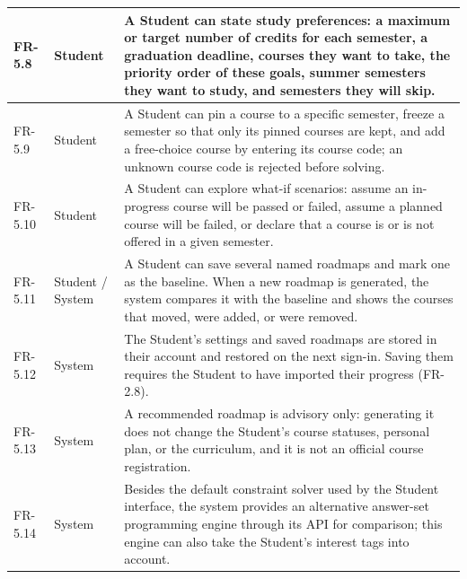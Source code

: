 \begin{longtable}{|p{}|p{}|p{}|}
\hline
FR-5.8 & Student & A Student can state study preferences: a maximum or target number of credits for each semester, a graduation deadline, courses they want to take, the priority order of these goals, summer semesters they want to study, and semesters they will skip. \\
\hline
FR-5.9 & Student & A Student can pin a course to a specific semester, freeze a semester so that only its pinned courses are kept, and add a free-choice course by entering its course code; an unknown course code is rejected before solving. \\
\hline
FR-5.10 & Student & A Student can explore what-if scenarios: assume an in-progress course will be passed or failed, assume a planned course will be failed, or declare that a course is or is not offered in a given semester. \\
\hline
FR-5.11 & Student / System & A Student can save several named roadmaps and mark one as the baseline. When a new roadmap is generated, the system compares it with the baseline and shows the courses that moved, were added, or were removed. \\
\hline
FR-5.12 & System & The Student's settings and saved roadmaps are stored in their account and restored on the next sign-in. Saving them requires the Student to have imported their progress (FR-2.8). \\
\hline
FR-5.13 & System & A recommended roadmap is advisory only: generating it does not change the Student's course statuses, personal plan, or the curriculum, and it is not an official course registration. \\
\hline
FR-5.14 & System & Besides the default constraint solver used by the Student interface, the system provides an alternative answer-set programming engine through its API for comparison; this engine can also take the Student's interest tags into account. \\
\hline
\end{longtable}

